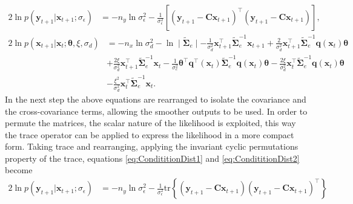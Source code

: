 \documentclass[]{article}
\begin{document}
\begin{align}\label{eq:CondititionDist1}
2\ln p\left(\mathbf y_{t+1}|\mathbf x_{t+1};\sigma_{\epsilon}\right)&=-n_y\ln \sigma_{\epsilon}^2-\frac{1}{\sigma_{\epsilon}^2}\left[ (\mathbf y_{t+1}-\mathbf C\mathbf  x_{t+1})^\top(\mathbf y_{t+1}-\mathbf C\mathbf  x_{t+1})\right],
\end{align}
\begin{align}
2\ln p(\mathbf x_{t+1}|\mathbf x_{t};\boldsymbol \theta ,\xi, \sigma_d)&=-n_x\ln\sigma_d^2-\ln\mid\tilde{\boldsymbol\Sigma}_e\mid-\frac{1}{\sigma_d^2}\mathbf x_{t+1}^\top\tilde{\boldsymbol\Sigma}_e^{-1}\mathbf x_{t+1}+\frac{2}{\sigma_d^2}\mathbf x_{t+1}^\top\tilde{\boldsymbol\Sigma}_e^{-1}\mathbf q( \mathbf x_t)\boldsymbol\theta\nonumber \\
&+\frac{2\xi}{\sigma_d^2}\mathbf x_{t+1}^\top\tilde{\boldsymbol\Sigma}_e^{-1}\mathbf x_t -\frac{1}{\sigma_e^2}\boldsymbol\theta^\top \mathbf q^\top(\mathbf x_t)\tilde{\boldsymbol\Sigma}_e^{-1}\mathbf q(\mathbf x_t)\boldsymbol\theta-\frac{2\xi}{\sigma_d^2} \mathbf x_t^\top\tilde{\boldsymbol\Sigma}_e^{-1}\mathbf q(\mathbf x_t)\boldsymbol\theta\nonumber\nonumber \\
& -\frac{\xi^2}{\sigma_d^2}\mathbf x_t^\top\tilde{\boldsymbol\Sigma}_e^{-1}\mathbf x_t. \label{eq:CondititionDist2}
\end{align}
In the next step the above equations are rearranged to isolate the covariance and the cross-covariance terms, allowing the smoother outputs to be used. In order to permute the matrices, the scalar nature of the likelihood is exploited, this way the trace operator can be applied to express the likelihood in a more compact form. Taking trace and rearranging, applying the invariant cyclic permutations property of the trace, equations \eqref{eq:CondititionDist1} and \eqref{eq:CondititionDist2} become
\begin{align}\label{eq:Qfunctiontrace1}
  2\ln p\left(\mathbf y_{t+1}|\mathbf x_{t+1};\sigma_{\epsilon}\right) &= -n_y\ln \sigma_{\epsilon}^2-\frac{1}{\sigma_{\epsilon}^2}\mathrm{tr}\left\lbrace(\mathbf y_{t+1}-\mathbf C\mathbf  x_{t+1}) (\mathbf y_{t+1}-\mathbf C\mathbf  x_{t+1})^\top\right\rbrace    
\end{align}
\end{document}
